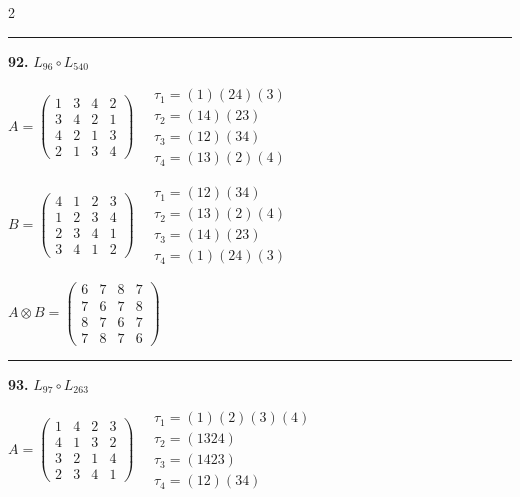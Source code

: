\begin{multicols}{2}
\vspace{0.3em}
\hrule
\vspace{0.3em}

\noindent\textbf{92.} $L_{96} \circ L_{540}$

$A = \begin{pmatrix} 1 & 3 & 4 & 2 \\ 3 & 4 & 2 & 1 \\ 4 & 2 & 1 & 3 \\ 2 & 1 & 3 & 4 \end{pmatrix} \quad \begin{matrix} \tau_{1}=(1)(2 4)(3) \\ \tau_{2}=(1 4)(2 3) \\ \tau_{3}=(1 2)(3 4) \\ \tau_{4}=(1 3)(2)(4) \end{matrix}$

$B = \begin{pmatrix} 4 & 1 & 2 & 3 \\ 1 & 2 & 3 & 4 \\ 2 & 3 & 4 & 1 \\ 3 & 4 & 1 & 2 \end{pmatrix} \quad \begin{matrix} \tau_{1}=(1 2)(3 4) \\ \tau_{2}=(1 3)(2)(4) \\ \tau_{3}=(1 4)(2 3) \\ \tau_{4}=(1)(2 4)(3) \end{matrix}$

$A \otimes B = \begin{pmatrix} 6 & 7 & 8 & 7 \\ 7 & 6 & 7 & 8 \\ 8 & 7 & 6 & 7 \\ 7 & 8 & 7 & 6 \end{pmatrix}$

\vspace{0.3em}
\hrule
\vspace{0.3em}

\noindent\textbf{93.} $L_{97} \circ L_{263}$

$A = \begin{pmatrix} 1 & 4 & 2 & 3 \\ 4 & 1 & 3 & 2 \\ 3 & 2 & 1 & 4 \\ 2 & 3 & 4 & 1 \end{pmatrix} \quad \begin{matrix} \tau_{1}=(1)(2)(3)(4) \\ \tau_{2}=(1 3 2 4) \\ \tau_{3}=(1 4 2 3) \\ \tau_{4}=(1 2)(3 4) \end{matrix}$


\end{multicols}
